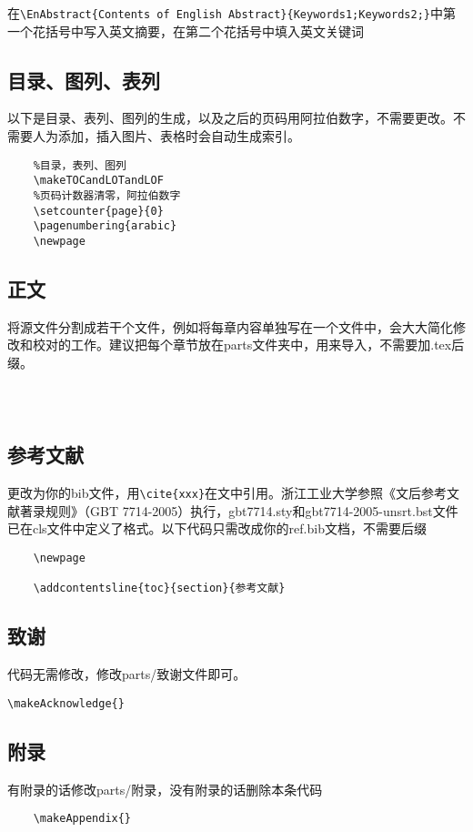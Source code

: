 在\verb|\EnAbstract{Contents of English Abstract}{Keywords1;Keywords2;}|中第一个花括号中写入英文摘要，在第二个花括号中填入英文关键词


\subsection{目录、图列、表列}

以下是目录、表列、图列的生成，以及之后的页码用阿拉伯数字，不需要更改。不需要人为添加，插入图片、表格时会自动生成索引。

\begin{lstlisting}
	%目录，表列、图列
	\makeTOCandLOTandLOF
	%页码计数器清零，阿拉伯数字
	\setcounter{page}{0}
	\pagenumbering{arabic}
	\newpage
\end{lstlisting}

\subsection{正文}

将源文件分割成若干个文件，例如将每章内容单独写在一个文件中，会大大简化修改和校对的工作。建议把每个章节放在parts文件夹中，用\verb||来导入，不需要加.tex后缀。

\begin{lstlisting}
	
	
\end{lstlisting}

\subsection{参考文献}

\verb||更改为你的bib文件，用\verb|\cite{xxx}|在文中引用。浙江工业大学参照《文后参考文献著录规则》（GBT 7714-2005）执行，gbt7714.sty和gbt7714-2005-unsrt.bst文件已在cls文件中定义了格式。以下代码只需改成你的ref.bib文档，不需要后缀

\begin{lstlisting}
	\newpage
	
	\addcontentsline{toc}{section}{参考文献}
\end{lstlisting}

\subsection{致谢}

代码无需修改，修改parts/致谢文件即可。

\begin{lstlisting}
\makeAcknowledge{}
\end{lstlisting}

\subsection{附录}

有附录的话修改parts/附录，没有附录的话删除本条代码

\begin{lstlisting}
	\makeAppendix{}
\end{lstlisting}

\newpage